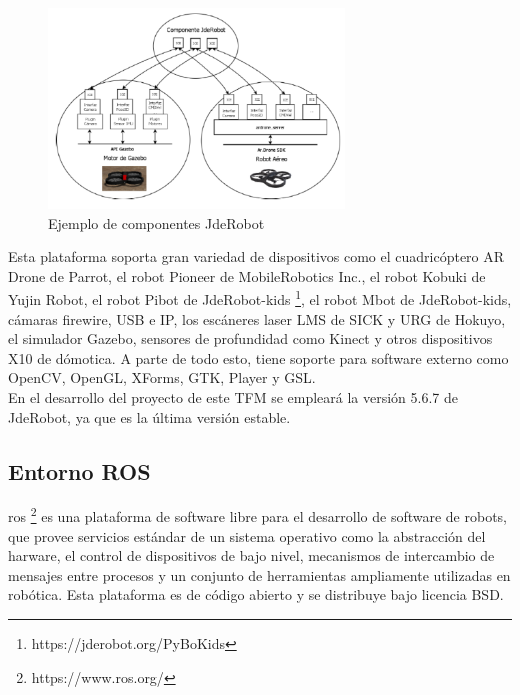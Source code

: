 \begin{figure}[H]
  \begin{center}
    \includegraphics[width=0.7\textwidth]{figures/Estado_arte/jderobot.png}
		\caption{Ejemplo de componentes JdeRobot }
		\label{fig.jderobot}
		\end{center}
\end{figure}

Esta plataforma soporta gran variedad de dispositivos como el cuadricóptero AR Drone de Parrot, el robot Pioneer de MobileRobotics Inc., el robot Kobuki de Yujin Robot, el robot Pibot de  JdeRobot-kids \footnote{https://jderobot.org/PyBoKids}, el robot Mbot de  JdeRobot-kids, cámaras firewire, USB e IP, los escáneres laser LMS de SICK y URG de Hokuyo, el simulador Gazebo, sensores de profundidad como Kinect y otros dispositivos X10 de dómotica. A parte de todo esto, tiene soporte para software externo como OpenCV, OpenGL, XForms, GTK, Player y GSL. \\

En el desarrollo del proyecto de este TFM se empleará la versión 5.6.7 de JdeRobot, ya que es la última versión estable.



\subsection{Entorno ROS}

\acrfull{ros} \footnote{https://www.ros.org/} \cite{middleware1} es una plataforma de software libre para el desarrollo de software de robots, que provee servicios estándar de un sistema operativo como la abstracción del harware, el control de dispositivos de bajo nivel, mecanismos de intercambio de mensajes entre procesos y un conjunto de herramientas ampliamente utilizadas en robótica. Esta plataforma es de código abierto y se distribuye bajo licencia BSD.\\


